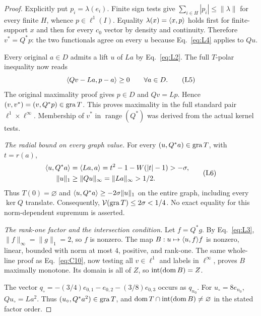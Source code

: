 \begin{proof}
Explicitly put $p_i=\lambda(e_i)$. Finite sign tests give
$\sum_{i\in H}|p_i|\le\|\lambda\|$ for every finite $H$, whence
$p\in\ell^1(I)$. Equality $\lambda(x)=\langle x,p\rangle$ holds first for
finite-support $x$ and then for every $c_0$ vector by density and continuity.
Therefore $v^*=Q^*p$: the two functionals agree on every $u$ because
Eq.~\eqref{eq:L4} applies to $Qu$.

Every original $a\in D$ admits a lift $u$ of $La$ by Eq.~\eqref{eq:L2}.
The full $T$-polar inequality now reads
\begin{equation}
\langle Qv-La,p-a\rangle\ge0\qquad\forall a\in D.
\tag{L5}\label{eq:L5}
\end{equation}
The original maximality proof gives $p\in D$ and $Qv=Lp$. Hence
$(v,v^*)=(v,Q^*p)\in\operatorname{gra} T$. This proves maximality in the
full standard pair $\ell^1\times\ell^\infty$. Membership of $v^*$ in
$\operatorname{range}(Q^*)$ was derived from the actual kernel tests.

\noindent\textit{The radial bound on every graph value.}
\label{sec:L3}
For every $(u,Q^*a)\in\operatorname{gra} T$, with $t=r(a)$,
\begin{equation}
\begin{aligned}
\langle u,Q^*a\rangle&=\langle La,a\rangle
 =t^2-1-W(|t|-1)>-\sigma,\\
\|u\|_1&\ge\|Qu\|_\infty=\|La\|_\infty>1/2.
\end{aligned}
\tag{L6}\label{eq:L6}
\end{equation}
Thus $T(0)=\varnothing$ and $\langle u,Q^*a\rangle\ge-2\sigma\|u\|_1$ on
the entire graph, including every $\ker Q$ translate. Consequently,
$\mathcal V(\operatorname{gra} T)\le2\sigma<1/4$. No exact equality for this
norm-dependent supremum is asserted.

\noindent\textit{The rank-one factor and the intersection condition.}
\label{sec:L4}
Let $f=Q^*g$. By Eq.~\eqref{eq:L3}, $\|f\|_\infty=\|g\|_1=2$, so $f$
is nonzero. The map $B:u\mapsto\langle u,f\rangle f$ is nonzero, linear, bounded
with norm at most $4$, positive, and rank-one. The same whole-line proof
as Eq.~\eqref{eq:C10}, now testing all $v\in\ell^1$ and labels in
$\ell^\infty$, proves $B$ maximally monotone.
Its domain is all of $Z$, so $\operatorname{int}(\operatorname{dom} B)=Z$.

The vector $q_\circ=-(3/4)e_{0,1}-e_{0,2}-(3/8)e_{0,3}$ occurs as
$q_{n_0}$. For $u_\circ=8e_{n_0}$, $Qu_\circ=La^2$.
Thus $(u_\circ,Q^*a^2)\in\operatorname{gra} T$, and
$\operatorname{dom} T\cap\operatorname{int}(\operatorname{dom} B)\ne\varnothing$ in the stated
factor order.


\end{proof}
